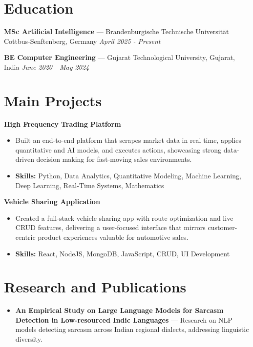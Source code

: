 \documentclass[a4paper,10pt]{article}
\begin{document}
\section*{Education}
\textbf{MSc Artificial Intelligence} — Brandenburgische Technische Universität Cottbus-Senftenberg, Germany \hfill \textit{April 2025 - Present}\par
\vspace{1.5pt}
\textbf{BE Computer Engineering} — Gujarat Technological University, Gujarat, India \hfill \textit{June 2020 - May 2024}\par

\section*{Main Projects}
\textbf{High Frequency Trading Platform}\par
\vspace{1pt}
\begin{itemize}
  \item Built an end-to-end platform that scrapes market data in real time, applies quantitative and AI models, and executes actions, showcasing strong data-driven decision making for fast-moving sales environments.
  \item \textbf{Skills:} Python, Data Analytics, Quantitative Modeling, Machine Learning, Deep Learning, Real-Time Systems, Mathematics
\end{itemize}
\vspace{3pt}
\textbf{Vehicle Sharing Application}\par
\vspace{1pt}
\begin{itemize}
  \item Created a full-stack vehicle sharing app with route optimization and live CRUD features, delivering a user-focused interface that mirrors customer-centric product experiences valuable for automotive sales.
  \item \textbf{Skills:} React, NodeJS, MongoDB, JavaScript, CRUD, UI Development
\end{itemize}

\section*{Research and Publications}
\begin{itemize}
\item \textbf{An Empirical Study on Large Language Models for Sarcasm Detection in Low-resourced Indic Languages} — Research on NLP models detecting sarcasm across Indian regional dialects, addressing linguistic diversity.
\end{itemize}
\end{document}

